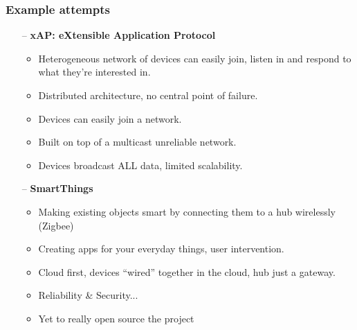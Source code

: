 \documentclass{beamer}
\begin{document}
\begin{frame}[t]\frametitle{Example attempts}

\begin{itemize}
    \item [--] \textbf{xAP: eXtensible Application Protocol}
  \begin{itemize}
    \item Heterogeneous network of devices can easily join, listen in and respond to what they're interested in.
    \item Distributed architecture, no central point of failure.
    \item Devices can easily join a network.
    \item Built on top of a multicast unreliable network.
    \item Devices broadcast ALL data, limited scalability.
  \end{itemize}
  \item [--] \textbf{SmartThings}
  \begin{itemize}
    \item Making existing objects smart by connecting them to a hub wirelessly (Zigbee)
    \item Creating apps for your everyday things, user intervention.
    \item Cloud first, devices ``wired'' together in the cloud, hub just a gateway.
    \item Reliability \& Security...
    \item Yet to really open source the project
  \end{itemize}
\end{itemize}
\end{frame}
\end{document}
